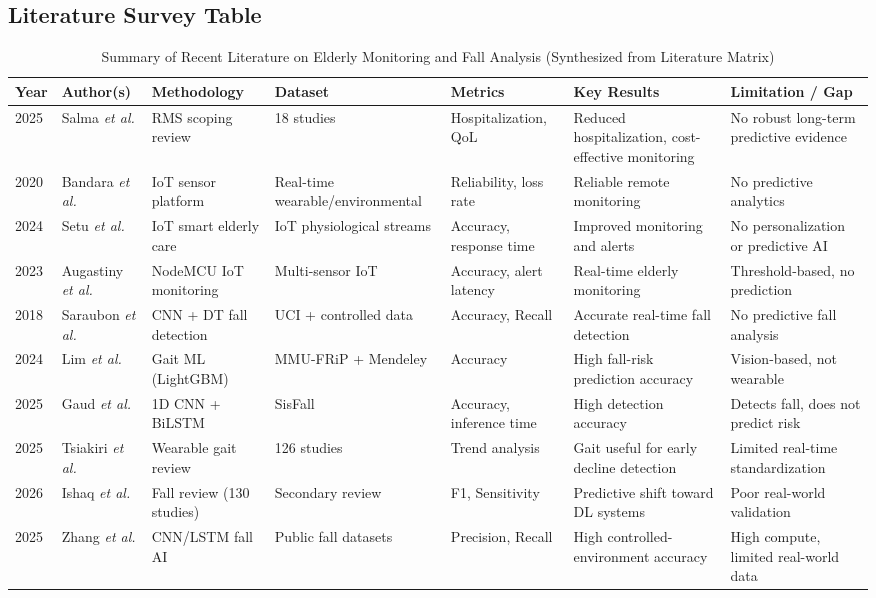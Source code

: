 \documentclass[conference]{IEEEtran}
\begin{document}
\subsection{Literature Survey Table}
\begin{table}[!t]
\centering
\caption{Summary of Recent Literature on Elderly Monitoring and Fall Analysis (Synthesized from Literature Matrix)}
\label{tab:litreview}
\scriptsize
\begin{threeparttable}
\begin{tabularx}{\textwidth}{p{1.2cm}p{2.6cm}p{2.5cm}p{2.0cm}p{2.0cm}p{2.4cm}p{2.7cm}}
\toprule
Year & Author(s) & Methodology & Dataset & Metrics & Key Results & Limitation / Gap \\
\midrule
2025 & Salma \textit{et al.} & RMS scoping review & 18 studies & Hospitalization, QoL & Reduced hospitalization, cost-effective monitoring & No robust long-term predictive evidence \\
2020 & Bandara \textit{et al.} & IoT sensor platform & Real-time wearable/environmental & Reliability, loss rate & Reliable remote monitoring & No predictive analytics \\
2024 & Setu \textit{et al.} & IoT smart elderly care & IoT physiological streams & Accuracy, response time & Improved monitoring and alerts & No personalization or predictive AI \\
2023 & Augastiny \textit{et al.} & NodeMCU IoT monitoring & Multi-sensor IoT & Accuracy, alert latency & Real-time elderly monitoring & Threshold-based, no prediction \\
2018 & Saraubon \textit{et al.} & CNN + DT fall detection & UCI + controlled data & Accuracy, Recall & Accurate real-time fall detection & No predictive fall analysis \\
2024 & Lim \textit{et al.} & Gait ML (LightGBM) & MMU-FRiP + Mendeley & Accuracy & High fall-risk prediction accuracy & Vision-based, not wearable \\
2025 & Gaud \textit{et al.} & 1D CNN + BiLSTM & SisFall & Accuracy, inference time & High detection accuracy & Detects fall, does not predict risk \\
2025 & Tsiakiri \textit{et al.} & Wearable gait review & 126 studies & Trend analysis & Gait useful for early decline detection & Limited real-time standardization \\
2026 & Ishaq \textit{et al.} & Fall review (130 studies) & Secondary review & F1, Sensitivity & Predictive shift toward DL systems & Poor real-world validation \\
2025 & Zhang \textit{et al.} & CNN/LSTM fall AI & Public fall datasets & Precision, Recall & High controlled-environment accuracy & High compute, limited real-world data \\
\bottomrule
\end{tabularx}
\end{threeparttable}
\end{table}
\end{document}
